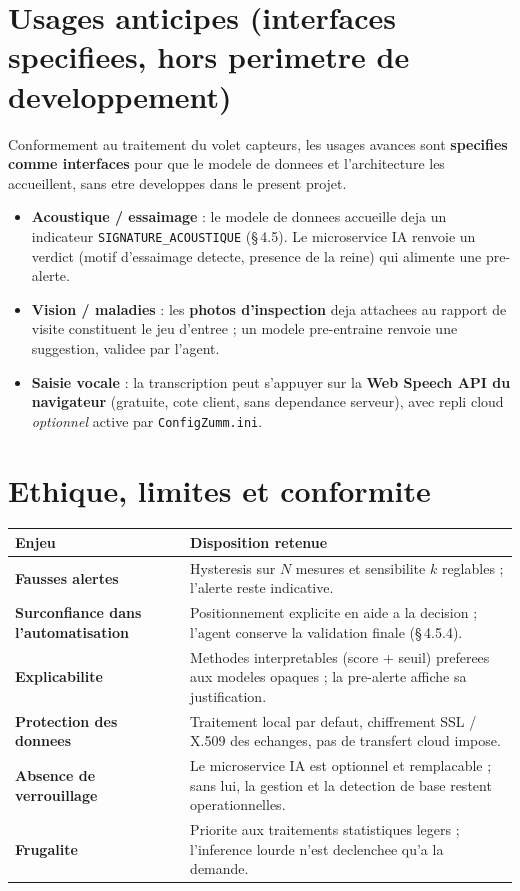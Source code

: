 \section{Usages anticipes (interfaces specifiees, hors perimetre de developpement)}
Conformement au traitement du volet capteurs, les usages avances sont
\textbf{specifies comme interfaces} pour que le modele de donnees et
l'architecture les accueillent, sans etre developpes dans le present projet.
\begin{itemize}
  \item \textbf{Acoustique / essaimage} : le modele de donnees accueille deja un
        indicateur \texttt{SIGNATURE\_ACOUSTIQUE} (§\,4.5). Le microservice IA
        renvoie un verdict (motif d'essaimage detecte, presence de la reine) qui
        alimente une pre-alerte.
  \item \textbf{Vision / maladies} : les \textbf{photos d'inspection} deja
        attachees au rapport de visite constituent le jeu d'entree ; un modele
        pre-entraine renvoie une suggestion, validee par l'agent.
  \item \textbf{Saisie vocale} : la transcription peut s'appuyer sur la
        \textbf{Web Speech API du navigateur} (gratuite, cote client, sans
        dependance serveur), avec repli cloud \emph{optionnel} active par
        \texttt{ConfigZumm.ini}.
\end{itemize}

\section{Ethique, limites et conformite}
\begin{xltabular}{\textwidth}{>{\bfseries}p{4.4cm} X}
\toprule
\textbf{Enjeu} & \textbf{Disposition retenue} \\
\midrule
\endhead
Fausses alertes & Hysteresis sur $N$ mesures et sensibilite $k$ reglables ; l'alerte reste indicative. \\
Surconfiance dans l'automatisation & Positionnement explicite en aide a la decision ; l'agent conserve la validation finale (§\,4.5.4). \\
Explicabilite & Methodes interpretables (score + seuil) preferees aux modeles opaques ; la pre-alerte affiche sa justification. \\
Protection des donnees & Traitement local par defaut, chiffrement SSL / X.509 des echanges, pas de transfert cloud impose. \\
Absence de verrouillage & Le microservice IA est optionnel et remplacable ; sans lui, la gestion et la detection de base restent operationnelles. \\
Frugalite & Priorite aux traitements statistiques legers ; l'inference lourde n'est declenchee qu'a la demande. \\
\bottomrule
\end{xltabular}


